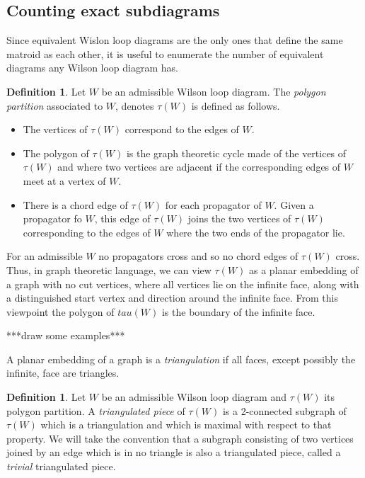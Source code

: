 \documentclass[11pt]{article}
\theoremstyle{remark}
\theoremstyle{definition}
\newtheorem{dfn}[thm]{Definition}
\begin{document}
\subsection{Counting exact subdiagrams}

Since equivalent Wislon loop diagrams are the only ones that define the same matroid as each other, it is useful to enumerate the number of equivalent diagrams any Wilson loop diagram has.

\begin{dfn}
  Let $W$ be an admissible Wilson loop diagram.  The \emph{polygon partition} associated to $W$, denotes $\tau(W)$ is defined as follows.
  \begin{itemize}
  \item The vertices of $\tau(W)$ correspond to the edges of $W$.
  \item The polygon of $\tau(W)$ is the graph theoretic cycle made of the vertices of $\tau(W)$ and where two vertices are adjacent if the corresponding edges of $W$ meet at a vertex of $W$.
  \item There is a chord edge of $\tau(W)$ for each propagator of $W$.  Given a propagator fo $W$, this edge of $\tau(W)$ joins the two vertices of $\tau(W)$ corresponding to the edges of $W$ where the two ends of the propagator lie.
  \end{itemize}
\end{dfn}

For an admissible $W$ no propagators cross and so no chord edges of $\tau(W)$ cross.  Thus, in graph theoretic language, we can view $\tau(W)$ as a planar embedding of a graph with no cut vertices, where all vertices lie on the infinite face, along with a distinguished start vertex and direction around the infinite face.  From this viewpoint the polygon of $tau(W)$ is the boundary of the infinite face.

***draw some examples***

A planar embedding of a graph is a \emph{triangulation} if all faces, except possibly the infinite, face are triangles.

\begin{dfn}
  Let $W$ be an admissible Wilson loop diagram and $\tau(W)$ its polygon partition.
  A \emph{triangulated piece} of $\tau(W)$ is a 2-connected subgraph of $\tau(W)$ which is a triangulation and which is maximal with respect to that property.  We will take the convention that a subgraph consisting of two vertices joined by an edge which is in no triangle is also a triangulated piece, called a \emph{trivial} triangulated piece.
\end{dfn}
\end{document}
